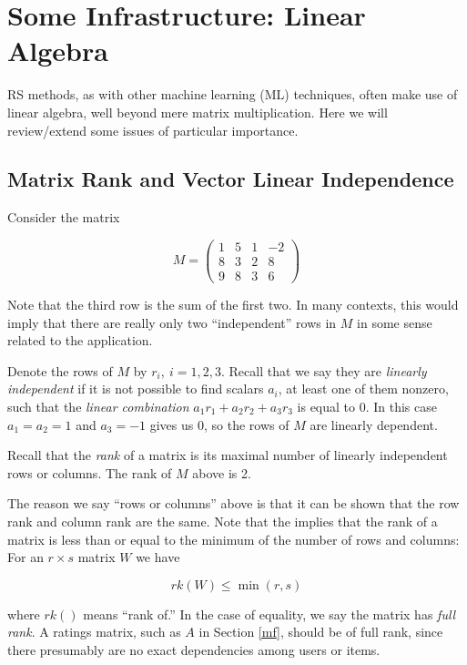 \chapter{Some Infrastructure: Linear Algebra}  
\label{chap:linalg}   

RS methods, as with other machine learning (ML) techniques, often make
use of linear algebra, well beyond mere matrix multiplication.  Here we
will review/extend some issues of particular importance.

\section{Matrix Rank and Vector Linear Independence}

Consider the matrix

\begin{equation}
\label{rankex1}
M = 
\left (
\begin{array}{rrrr}
1 & 5 & 1 & -2 \\
8 & 3 & 2 & 8 \\
9 & 8 & 3 & 6 
\end{array}
\right )
\end{equation}

Note that the third row is the sum of the first two.  In many contexts,
this would imply that there are really only two ``independent'' rows in
$M$ in some sense related to the application.  

Denote the rows of $M$ by $r_i, ~ i = 1,2,3$.  Recall that we say they
are \textit{linearly independent} if it is not possible to find scalars
$a_i$, at least one of them nonzero, such that the \textit{linear
combination} $a_1 r_1 + a_2 r_2 + a_3 r_3$ is equal to 0.  In this case
$a_1 = a_2 = 1$ and $a_3 = -1$ gives us 0, so the rows of $M$ are
linearly dependent.

Recall that the \textit{rank} of a matrix is its maximal number of
linearly independent rows or columns.  The rank of $M$ above is 2.

The reason we say ``rows or columns'' above is that it can be shown that
the row rank and column rank are the same.  Note that the implies that
the rank of a matrix is less than or equal to the minimum of the number
of rows and columns:  For an $r \times s$ matrix $W$ we have

\begin{equation}
rk(W) \leq \min(r,s)
\end{equation}

where $rk()$ means ``rank of.'' In the case of equality, we say the
matrix has \textit{full rank}.  A ratings matrix, such as $A$ in Section
\ref{mf}, should be of full rank, since there presumably are no exact
dependencies among users or items.

